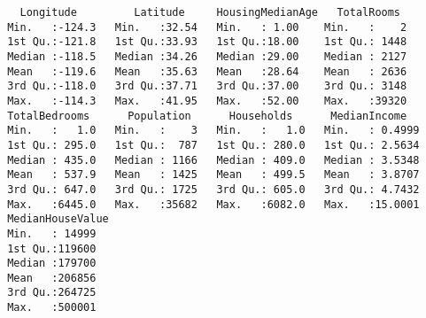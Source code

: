 \documentclass[11pt]{article}
\begin{document}
    
    \begin{verbatim}
   Longitude         Latitude     HousingMedianAge   TotalRooms   
 Min.   :-124.3   Min.   :32.54   Min.   : 1.00    Min.   :    2  
 1st Qu.:-121.8   1st Qu.:33.93   1st Qu.:18.00    1st Qu.: 1448  
 Median :-118.5   Median :34.26   Median :29.00    Median : 2127  
 Mean   :-119.6   Mean   :35.63   Mean   :28.64    Mean   : 2636  
 3rd Qu.:-118.0   3rd Qu.:37.71   3rd Qu.:37.00    3rd Qu.: 3148  
 Max.   :-114.3   Max.   :41.95   Max.   :52.00    Max.   :39320  
 TotalBedrooms      Population      Households      MedianIncome    
 Min.   :   1.0   Min.   :    3   Min.   :   1.0   Min.   : 0.4999  
 1st Qu.: 295.0   1st Qu.:  787   1st Qu.: 280.0   1st Qu.: 2.5634  
 Median : 435.0   Median : 1166   Median : 409.0   Median : 3.5348  
 Mean   : 537.9   Mean   : 1425   Mean   : 499.5   Mean   : 3.8707  
 3rd Qu.: 647.0   3rd Qu.: 1725   3rd Qu.: 605.0   3rd Qu.: 4.7432  
 Max.   :6445.0   Max.   :35682   Max.   :6082.0   Max.   :15.0001  
 MedianHouseValue
 Min.   : 14999  
 1st Qu.:119600  
 Median :179700  
 Mean   :206856  
 3rd Qu.:264725  
 Max.   :500001  
    \end{verbatim}
\end{document}
